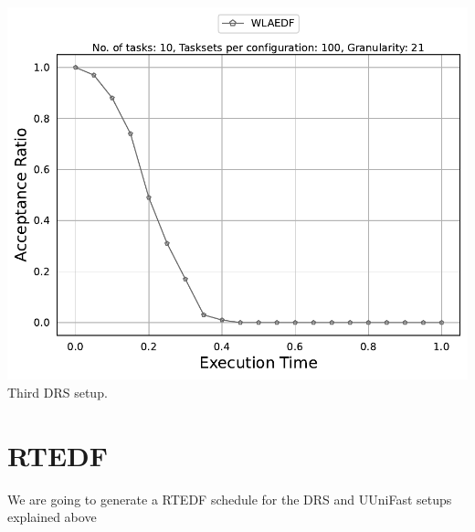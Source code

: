 \documentclass[]{article}
\begin{document}
\begin{minipage}[t]{0.48\linewidth}
		\includegraphics[width=\linewidth]{WLAEDF_3rdSetup_DRS.pdf}
		Third DRS setup.
		\vspace{0.3cm}
	\end{minipage}


	\clearpage
	\section{RTEDF}
{
\raggedleft We are going to generate a RTEDF schedule for the DRS and UUniFast setups explained above \newline
}
\end{document}
